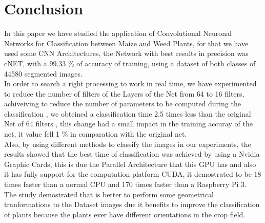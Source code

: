 \documentclass[conference]{IEEEtran}
\begin{document}
	




\section{Conclusion}

In this paper we have studied the application of Convolutional Neuronal Networks for Classification between Maize and Weed Plants, for that we have used some CNN Architectures, the Network with best results in precision was cNET, with a 99.33 \% of accuracy of training, using a dataset of both classes  of 44580 segmented images. \\

In order to search a right processing to work in real time, we have experimented to reduce the number of filters of the Layers of the Net from 64 to 16 filters, achiveiving to reduce the number of parameters to be computed during the classification , we obteined a classification time 2.5 times less than the original Net of 64 filters , this change had a small impact in the training accuray of the net, it value fell 1 \% in comparation with the original net. \\

Also, by using different methods to classify the images in our experiments, the results showed that the best time of classification was achieved by using a Nvidia Graphic Cards, this is due the Parallel Architecture that this GPU has and also it has fully support for the computation platform CUDA, it demostrated to be 18 times faster than a normal CPU and 170 times faster than a Raspberry Pi 3. \\

The study demostrated that is better to perform some geometrical tranformations to the Dataset images due it benefits to improve the  classification of plants because the plants ever have different orientations in the crop field. 
\end{document}
